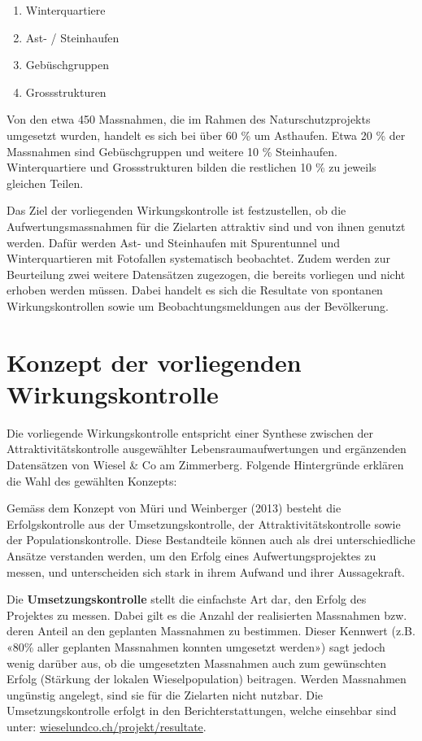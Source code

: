 \documentclass[
  oneside]{scrbook}
\providecommand{\tightlist}{%
  \setlength{\itemsep}{0pt}\setlength{\parskip}{0pt}}
\begin{document}
\begin{enumerate}
\def\labelenumi{\arabic{enumi}.}
\tightlist
\item
  Winterquartiere
\item
  Ast- / Steinhaufen
\item
  Gebüschgruppen
\item
  Grossstrukturen
\end{enumerate}

Von den etwa 450 Massnahmen, die im Rahmen des Naturschutzprojekts umgesetzt wurden, handelt es sich bei über 60 \% um Asthaufen. Etwa 20 \% der Massnahmen sind Gebüschgruppen und weitere 10 \% Steinhaufen. Winterquartiere und Grossstrukturen bilden die restlichen 10 \% zu jeweils gleichen Teilen.

Das Ziel der vorliegenden Wirkungskontrolle ist festzustellen, ob die Aufwertungsmassnahmen für die Zielarten attraktiv sind und von ihnen genutzt werden. Dafür werden Ast- und Steinhaufen mit Spurentunnel und Winterquartieren mit Fotofallen systematisch beobachtet. Zudem werden zur Beurteilung zwei weitere Datensätzen zugezogen, die bereits vorliegen und nicht erhoben werden müssen. Dabei handelt es sich die Resultate von spontanen Wirkungskontrollen sowie um Beobachtungsmeldungen aus der Bevölkerung.

\hypertarget{konzept-der-vorliegenden-wirkungskontrolle}{%
\chapter{Konzept der vorliegenden Wirkungskontrolle}\label{konzept-der-vorliegenden-wirkungskontrolle}}

Die vorliegende Wirkungskontrolle entspricht einer Synthese zwischen der Attraktivitätskontrolle ausgewählter Lebensraumaufwertungen und ergänzenden Datensätzen von Wiesel \& Co am Zimmerberg. Folgende Hintergründe erklären die Wahl des gewählten Konzepts:

Gemäss dem Konzept von Müri und Weinberger (2013) besteht die Erfolgskontrolle aus der Umsetzungskontrolle, der Attraktivitätskontrolle sowie der Populationskontrolle. Diese Bestandteile können auch als drei unterschiedliche Ansätze verstanden werden, um den Erfolg eines Aufwertungsprojektes zu messen, und unterscheiden sich stark in ihrem Aufwand und ihrer Aussagekraft.

Die \textbf{Umsetzungskontrolle} stellt die einfachste Art dar, den Erfolg des Projektes zu messen. Dabei gilt es die Anzahl der realisierten Massnahmen bzw. deren Anteil an den geplanten Massnahmen zu bestimmen. Dieser Kennwert (z.B. «80\% aller geplanten Massnahmen konnten umgesetzt werden») sagt jedoch wenig darüber aus, ob die umgesetzten Massnahmen auch zum gewünschten Erfolg (Stärkung der lokalen Wieselpopulation) beitragen. Werden Massnahmen ungünstig angelegt, sind sie für die Zielarten nicht nutzbar. Die Umsetzungskontrolle erfolgt in den Berichterstattungen, welche einsehbar sind unter: \href{http://www.wieselundco.ch/projekt/resultate}{wieselundco.ch/projekt/resultate}.
\end{document}
